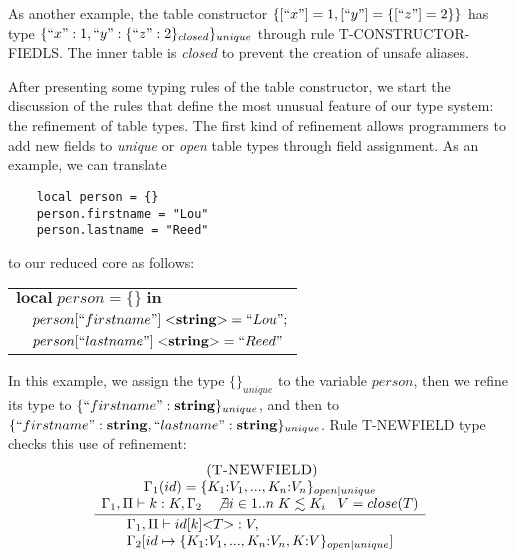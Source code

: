 \documentclass{sigplanconf}
\newcommand{\String}{\mathbf{string}}
\newcommand{\mylabel}[1]{\; (\textsc{#1})}
\newcommand{\env}{\Gamma}
\newcommand{\penv}{\Pi}
\begin{document}
As another example, the table constructor $\{[``x"] = 1, [``y"] = \{[``z"] = 2\}\}$
has type $\{``x":1, ``y":\{``z":2\}_{closed}\}_{unique}$ through rule
\textsc{T-CONSTRUCTOR-FIEDLS}.
The inner table is \emph{closed} to prevent the creation of unsafe aliases.

After presenting some typing rules of the table constructor,
we start the discussion of the rules that define the most
unusual feature of our type system: the refinement of table types.
The first kind of refinement allows programmers to add new
fields to \emph{unique} or \emph{open} table types through
field assignment.
As an example, we can translate
\begin{verbatim}
    local person = {}
    person.firstname = "Lou"
    person.lastname = "Reed"
\end{verbatim}
to our reduced core as follows:
\begin{center}
\begin{tabular}{ll}
\multicolumn{2}{l}{$\mathbf{local} \; person = \{\} \; \mathbf{in}$}\\
& \multicolumn{1}{l}{$person[``firstname"] \; {<}\String{>} = ``Lou";$}\\
& \multicolumn{1}{l}{$person[``lastname"] \; {<}\String{>} = ``Reed"$}
\end{tabular}
\end{center}

In this example, we assign the type $\{\}_{unique}$ to the variable
$person$, then we refine its type to $\{``firstname":\String\}_{unique}$,
and then to $\{``firstname":\String, ``lastname":\String\}_{unique}$.
Rule \textsc{T-NEWFIELD} type checks this use of refinement:
\[
\begin{array}{c}
\mylabel{T-NEWFIELD}\\
\dfrac{\begin{array}{c}
       \env_{1}(id) = \{ K_{1}{:}V_{1}, ..., K_{n}{:}V_{n} \}_{open|unique}\\
       \env_{1}, \penv \vdash k:K, \env_{2} \;\;\;
       \not \exists i \in 1..n \; K \lesssim K_{i} \;\;\;
       V = close(T)
       \end{array}}
      {\begin{array}{l}
       \env_{1}, \penv \vdash id[k] {<}T{>}:V, \\
       \env_{2}[id \mapsto \{ K_{1}{:}V_{1}, ..., K_{n}{:}V_{n}, K{:}V\}_{open|unique}]
       \end{array}}
\end{array}
\]
\end{document}
